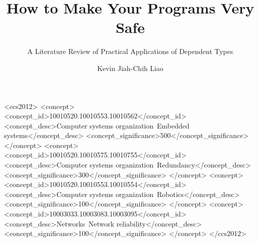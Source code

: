 \documentclass[sigplan, review]{acmart}
\begin{document}
\title{How to Make Your Programs Very Safe}
\subtitle{A Literature Review of Practical Applications of Dependent Types}

\author{Kevin Jiah-Chih Liao}


\renewcommand{\shortauthors}{Liao}
%
%
\begin{CCSXML}
<ccs2012>
 <concept>
  <concept_id>10010520.10010553.10010562</concept_id>
  <concept_desc>Computer systems organization~Embedded systems</concept_desc>
  <concept_significance>500</concept_significance>
 </concept>
 <concept>
  <concept_id>10010520.10010575.10010755</concept_id>
  <concept_desc>Computer systems organization~Redundancy</concept_desc>
  <concept_significance>300</concept_significance>
 </concept>
 <concept>
  <concept_id>10010520.10010553.10010554</concept_id>
  <concept_desc>Computer systems organization~Robotics</concept_desc>
  <concept_significance>100</concept_significance>
 </concept>
 <concept>
  <concept_id>10003033.10003083.10003095</concept_id>
  <concept_desc>Networks~Network reliability</concept_desc>
  <concept_significance>100</concept_significance>
 </concept>
</ccs2012>  
\end{CCSXML}




\maketitle




 
\end{document}
